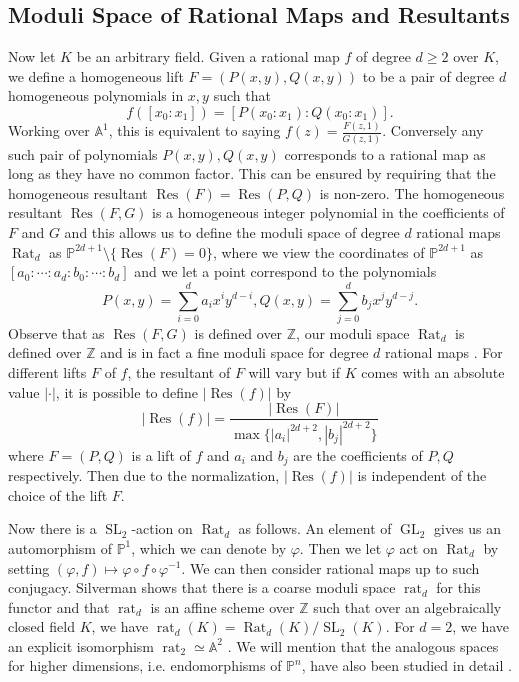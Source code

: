 \documentclass[10pt]{amsart}
\newcommand{\bb}{\mathbb}
\newcommand{\vphi}{\varphi}
\newcommand{\Res}{\operatorname{Res}}
\newcommand{\Rat}{\operatorname{Rat}}
\newcommand{\GL}{\operatorname{GL}}
\newcommand{\rat}{\operatorname{rat}}
\newcommand{\SL}{\operatorname{SL}}
\numberwithin{theorem}{section}
\numberwithin{example}{section}
\numberwithin{definition}{section}
\begin{document}
\subsection{Moduli Space of Rational Maps and Resultants} Now let $K$ be an arbitrary field. Given a rational map $f$ of degree $d \geq 2$ over $K$, we define a homogeneous lift $F = (P(x,y), Q(x,y))$ to be a pair of degree $d$ homogeneous polynomials in $x,y$ such that 
$$f([x_0:x_1]) = [P(x_0:x_1):Q(x_0:x_1)].$$
Working over $\bb{A}^1$, this is equivalent to saying $f(z) = \frac{F(z,1)}{G(z,1)}$. Conversely any such pair of polynomials $P(x,y),Q(x,y)$ corresponds to a rational map as long as they have no common factor. This can be ensured by requiring that the homogeneous resultant $\Res(F) = \Res(P,Q)$ is non-zero. The homogeneous resultant $\Res(F,G)$ is a homogeneous integer polynomial in the coefficients of $F$ and $G$ and this allows us to define the moduli space of degree $d$ rational maps $\Rat_d$ as $\bb{P}^{2d+1} \setminus \{\Res(F) = 0\}$, where we view the coordinates of $\bb{P}^{2d+1}$ as $[a_0: \cdots : a_d: b_0 : \cdots : b_d]$ and we let a point correspond to the polynomials
$$P(x,y) = \sum_{i=0}^{d} a_i x^i y^{d-i}, Q(x,y) = \sum_{j=0}^{d} b_j x^j y^{d-j}.$$
Observe that as $\Res(F,G)$ is defined over $\bb{Z}$, our moduli space $\Rat_d$ is defined over $\bb{Z}$ and is in fact a fine moduli space for degree $d$ rational maps \cite{Sil98}. For different lifts $F$ of $f$, the resultant of $F$ will vary but if $K$ comes with an absolute value $|\cdot |$, it is possible to define $|\Res(f)|$ by 
$$|\Res(f)| = \frac{|\Res(F)|}{\max\{|a_i|^{2d+2}, |b_j|^{2d+2}\}}$$
where $F = (P,Q)$ is a lift of $f$ and $a_i$ and $b_j$ are the coefficients of $P,Q$ respectively. Then due to the normalization, $|\Res(f)|$ is independent of the choice of the lift $F$. 
\par 
Now there is a $\SL_2$-action on $\Rat_d$ as follows. An element of $\GL_2$ gives us an automorphism of $\bb{P}^1$, which we can denote by $\vphi$. Then we let $\vphi$ act on $\Rat_d$ by setting $(\vphi,f) \mapsto \vphi \circ f \circ \vphi^{-1}$. We can then consider rational maps up to such conjugacy. Silverman \cite{Sil98} shows that there is a coarse moduli space $\rat_d$ for this functor and that $\rat_d$ is an affine scheme over $\bb{Z}$ such that over an algebraically closed field $K$, we have $\rat_d(K) = \Rat_d(K)/\SL_2(K)$. For $d = 2$, we have an explicit isomorphism $\rat_2 \simeq \bb{A}^2$ \cite{Mil93}. We will mention that the analogous spaces for higher dimensions, i.e. endomorphisms of $\bb{P}^n$, have also been studied in detail \cite{PST09, Lev11}.  
\end{document}
